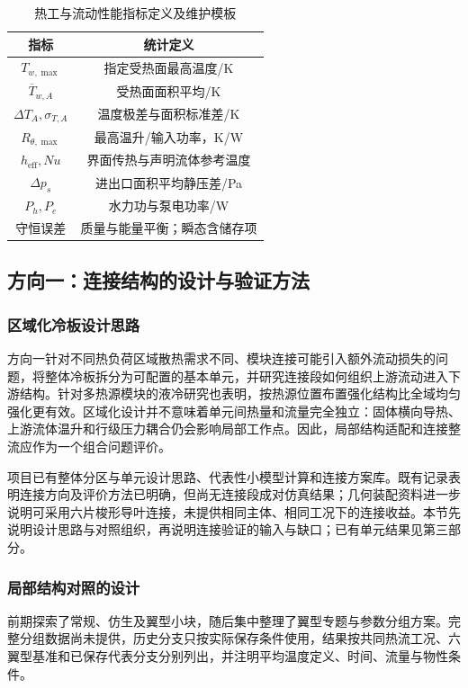 \documentclass[UTF8]{midterm}
\begin{document}
\begin{table}[!htbp]
\centering\small
\caption{热工与流动性能指标定义及维护模板}\label{tab:06}
\begin{tabularx}{\linewidth}{CC}
\toprule
{} 指标 & 统计定义 \\
\midrule
$T_{w,\max}$ & 指定受热面最高温度/K \\
$\overline T_{w,A}$ & 受热面面积平均/K \\
$\Delta T_A,\sigma_{T,A}$ & 温度极差与面积标准差/K \\
$R_{\theta,\max}$ & 最高温升/输入功率，K/W \\
$h_{\mathrm{eff}},Nu$ & 界面传热与声明流体参考温度 \\
$\Delta p_s$ & 进出口面积平均静压差/Pa \\
$P_h,P_e$ & 水力功与泵电功率/W \\
守恒误差 & 质量与能量平衡；瞬态含储存项 \\
\bottomrule
\end{tabularx}
\end{table}

\FloatBarrier
\subsection{方向一：连接结构的设计与验证方法}
\label{ch:connection}
\subsubsection{区域化冷板设计思路}
方向一针对不同热负荷区域散热需求不同、模块连接可能引入额外流动损失的问题，将整体冷板拆分为可配置的基本单元，并研究连接段如何组织上游流动进入下游结构。针对多热源模块的液冷研究也表明，按热源位置布置强化结构比全域均匀强化更有效\cite{ref2}。区域化设计并不意味着单元间热量和流量完全独立：固体横向导热、上游流体温升和行级压力耦合仍会影响局部工作点。因此，局部结构适配和连接整流应作为一个组合问题评价。

项目已有整体分区与单元设计思路、代表性小模型计算和连接方案库。既有记录表明连接方向及评价方法已明确，但尚无连接段成对仿真结果；几何装配资料进一步说明可采用六片梭形导叶连接，未提供相同主体、相同工况下的连接收益。本节先说明设计思路与对照组织，再说明连接验证的输入与缺口；已有单元结果见第三部分。

\subsubsection{局部结构对照的设计}
前期探索了常规、仿生及翼型小块，随后集中整理了翼型专题与参数分组方案。完整分组数据尚未提供，历史分支只按实际保存条件使用，结果按共同热流工况、六翼型基准和已保存代表分支分别列出，并注明平均温度定义、时间、流量与物性条件\cite{stagereports}。
\end{document}

